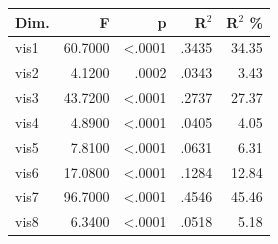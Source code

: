 \begin{table}
\begin{tabular}{lrrrr}
\toprule
Dim. & F & p & R$^2$ & R$^2$ \% \\
\midrule
vis1 & 60.7000 & <.0001 & .3435 & 34.35 \\
vis2 & 4.1200 & .0002 & .0343 & 3.43 \\
vis3 & 43.7200 & <.0001 & .2737 & 27.37 \\
vis4 & 4.8900 & <.0001 & .0405 & 4.05 \\
vis5 & 7.8100 & <.0001 & .0631 & 6.31 \\
vis6 & 17.0800 & <.0001 & .1284 & 12.84 \\
vis7 & 96.7000 & <.0001 & .4546 & 45.46 \\
vis8 & 6.3400 & <.0001 & .0518 & 5.18 \\
\bottomrule
\end{tabular}
\end{table}
